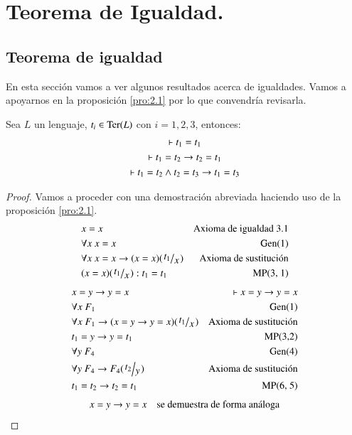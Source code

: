 
\chapter{Teorema de Igualdad.}


\section{Teorema de igualdad}

En esta sección vamos a ver algunos resultados acerca de igualdades. Vamos a apoyarnos en la proposición \ref{pro:2.1} por lo que convendría revisarla.

\begin{lm}[$=$ en las consecuencias sintácticas]\label{lm:igualsintactico}
    Sea $L$ un lenguaje, $t_i \in \mathrm{Ter}(L)$ con $i = 1, 2, 3$, entonces:
    \begin{gather*}
        \vdash t_1 = t_1\\
        \vdash t_1 = t_2 \rightarrow t_2 = t_1\\
        \vdash t_1 = t_2 \land t_2 = t_3 \rightarrow t_1 = t_3
    \end{gather*}
\end{lm}

\begin{proof}
    Vamos a proceder con una demostración abreviada haciendo uso de la proposición \ref{pro:2.1}.
    \begin{align}
        &x=x &\text{Axioma de igualdad 3.1}\\
        &\forall x\ x=x&\text{Gen(1)}\\
        &\forall x\ x=x \then (x=x)(\quo{t_1}{x})&\text{Axioma de sustitución}\\
        &(x=x)(\quo{t_1}{x}): t_1=t_1&\text{MP(3, 1)}
    \end{align}
    \begin{align}
        &x=y \then y=x   &\vdash x=y \then y=x\\
        &\forall x\ F_1   &   \text{Gen(1)}\\
        &\forall x\ F_1 \then (x=y \then y=x)(\quo{t_1}{x})   &   \text{Axioma de sustitución}\\
        &t_1 = y \then y = t_1   &   \text{MP(3,2)}\\
        &\forall y\ F_4   &   \text{Gen(4)}\\
        &\forall y\ F_4 \then F_4(\quo{t_2}{y})   &   \text{Axioma de sustitución}\\
        &t_1 = t_2 \then t_2 = t_1   &   \text{MP(6, 5)}
    \end{align}
    \begin{align} %
        &x=y \then y=x   &\text{se demuestra de forma análoga}
    \end{align}
\end{proof}

